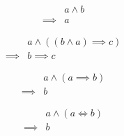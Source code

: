 \begin{prop}
\label{Proposition:land_omit}
\begin{align*}
& a \land b \\
\implies & a
\end{align*}
\end{prop}

\begin{prop}
\label{Proposition:lemma_uniqueness}
\begin{align*}
& a \land ((b \land a) \implies c) \\
\implies & b \implies c
\end{align*}
\end{prop}

\begin{prop}
\label{Proposition:implies_satisfy}
\begin{align*}
& a \land (a \implies b) \\
\implies & b
\end{align*}
\end{prop}

\begin{prop}
\label{Proposition:iff_satisfy}
\begin{align*}
& a \land (a \iff b) \\
\implies & b
\end{align*}
\end{prop}

